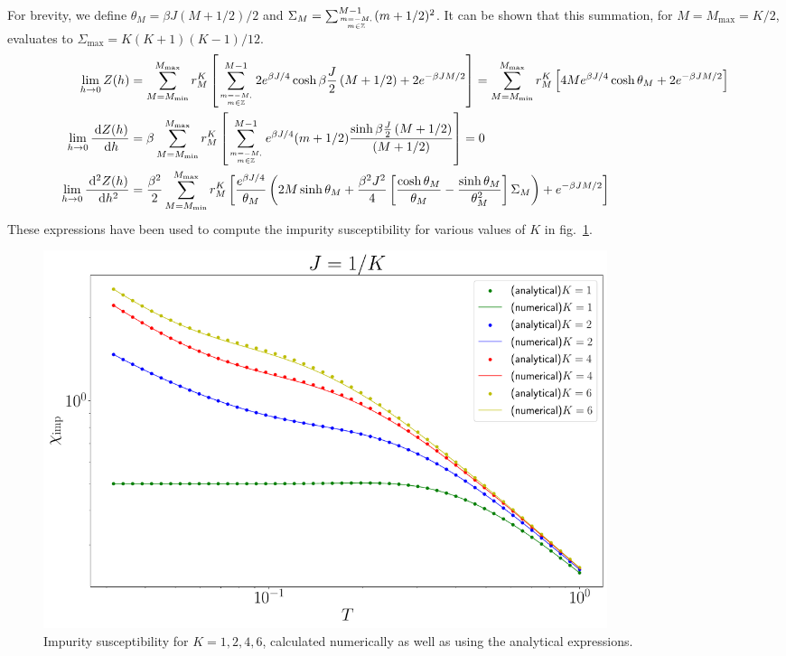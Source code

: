 \documentclass{revtex4-2}
\numberwithin{equation}{section}
\begin{document}
For brevity, we define \(\theta_M = \beta J (M+1/2)/2\) and \(\Sigma_M = \sum_{m=-M, \atop{m\in \mathbb{Z}}}^{M-1}(m+1/2)^2\). It can be shown that this summation, for \(M=M_\text{max}=K/2\), evaluates to \(\Sigma_\text{max} = K(K+1)(K-1)/12\).
\begin{equation}\begin{aligned}
	\lim_{h \to 0}Z(h) &= \sum_{M=M_\text{min}}^{M_\text{max}}r^K_M\left[\sum_{m=-M, \atop{m\in \mathbb{Z}}}^{M-1}2e^{\beta J/4}\cosh \beta \frac{J}{2}\left( M + 1/2 \right) + 2e^{-\beta JM/2}\right] = \sum_{M=M_\text{min}}^{M_\text{max}}r^K_M\left[4Me^{\beta J/4}\cosh \theta_M + 2e^{-\beta JM/2}\right]\\
	\lim_{h \to 0}\frac{\:\mathrm{d}Z(h)}{\:\mathrm{d}h} &=  \beta\sum_{M=M_\text{min}}^{M_\text{max}}r^K_M\left[\sum_{m=-M, \atop{m\in \mathbb{Z}}}^{M-1}e^{\beta J/4}(m+1/2)\frac{\sinh \beta\frac{J}{2}\left( M + 1/2 \right) }{\left( M + 1/2 \right)}\right] = 0\\
	\lim_{h \to 0}\frac{\:\mathrm{d}^2Z(h)}{\:\mathrm{d}h^2} &= \frac{\beta^2}{2}\sum_{M=M_\text{min}}^{M_\text{max}}r^K_M\left[\frac{e^{\beta J/4}}{\theta_M}\left(2M\sinh \theta_M + \frac{\beta^2 J^2}{4}\left[\frac{\cosh\theta_M}{\theta_M} - \frac{\sinh \theta_M}{\theta_M^2}\right]\Sigma_M\right)+ e^{-\beta JM/2}\right]\\
\end{aligned}\end{equation}
These expressions have been used to compute the impurity susceptibility for various values of \(K\) in fig.~\ref{chi_mchannel}.
\begin{figure}[htpb]
	\centering
	\includegraphics[width=0.8\textwidth]{../numerics/chi_mchannel.pdf}
	\caption{Impurity susceptibility for \(K=1,2,4,6\), calculated numerically as well as using the analytical expressions.}
	\label{chi_mchannel}
\end{figure}
\end{document}
